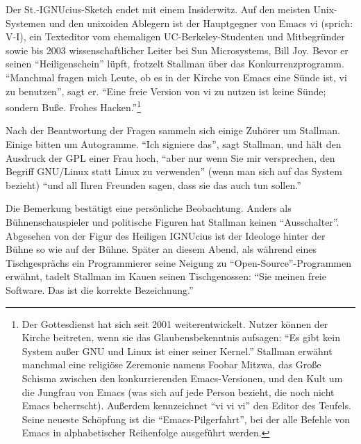 Der St.-IGNUcius-Sketch endet mit einem Insiderwitz. Auf den meisten Unix-Systemen und den unixoiden Ablegern ist der Hauptgegner von Emacs vi (sprich: V-I), ein Texteditor vom ehemaligen UC-Berkeley-Studenten und Mitbegründer sowie bis 2003 wissenschaftlicher Leiter bei Sun Microsystems, Bill Joy. Bevor er seinen "`Heiligenschein"' lüpft, frotzelt Stallman über das Konkurrenzprogramm. "`Manchmal fragen mich Leute, ob es in der Kirche von Emacs eine Sünde ist, vi zu benutzen"', sagt er. "`Eine freie Version von vi zu nutzen ist keine Sünde; sondern Buße. Frohes Hacken."'\footnote{Der Gottesdienst hat sich seit 2001 weiterentwickelt. Nutzer können der Kirche beitreten, wenn sie das Glaubensbekenntnis aufsagen: "`Es gibt kein System außer GNU und Linux ist einer seiner Kernel."' Stallman erwähnt manchmal eine religiöse Zeremonie namens Foobar Mitzwa, das Große Schisma zwischen den konkurrierenden Emacs-Versionen, und den Kult um die Jungfrau von Emacs (was sich auf jede Person bezieht, die noch nicht Emacs beherrscht).\footnotemark{} Außerdem kennzeichnet "`vi vi vi"' den Editor des Teufels. Seine neueste Schöpfung ist die "`Emacs-Pilgerfahrt"', bei der alle Befehle von Emacs in alphabetischer Reihenfolge ausgeführt werden.}

Nach der Beantwortung der Fragen sammeln sich einige Zuhörer um Stallman. Einige bitten um Autogramme. "`Ich signiere das"', sagt Stallman, und hält den Ausdruck der GPL einer Frau hoch, "`aber nur wenn Sie mir versprechen, den Begriff GNU/Linux statt Linux zu verwenden"' (wenn man sich auf das System bezieht) "`und all Ihren Freunden sagen, dass sie das auch tun sollen."'

Die Bemerkung bestätigt eine persönliche Beobachtung. Anders als Bühnenschauspieler und politische Figuren hat Stallman keinen "`Ausschalter"'. Abgesehen von der Figur des Heiligen IGNUcius ist der Ideologe hinter der Bühne so wie auf der Bühne. Später an diesem Abend, als während eines Tischgesprächs ein Programmierer seine Neigung zu "`Open-Source"'-Programmen erwähnt, tadelt Stallman im Kauen seinen Tischgenossen: "`Sie meinen freie Software. Das ist die korrekte Bezeichnung."'

